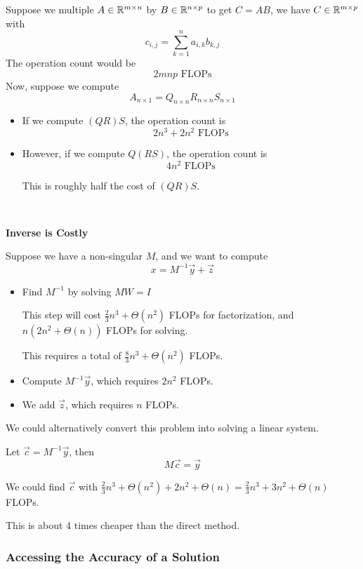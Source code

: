 Suppose we multiple \( A \in \mathbb{R}^{m \times n} \) by \( B \in \mathbb{R}^{n \times p} \) to get \( C = AB \), we have \( C \in \mathbb{R}^{m \times p} \) with \[
    c_{i, j} = \sum_{k=1}^n a_{i, k} b_{k, j}
\] The operation count would be \[
    2 mnp \text{ FLOPs}
\]
Now, suppose we compute \[
    A_{n \times 1} = Q_{n \times n} R_{n \times n} S_{n \times 1}
\]
\begin{itemize}
    \item If we compute \( (QR)S \), the operation count is \[
              2n^3 + 2n^2 \text{ FLOPs}
          \]

    \item However, if we compute \( Q(RS) \), the operation count is \[
              4n^2 \text{ FLOPs}
          \]

          This is roughly half the cost of \( (QR)S \).
\end{itemize}

{~~~}

\noindent
\textbf{Inverse is Costly}

Suppose we have a non-singular \( M \), and we want to compute \[
    x = M^{-1} \vec{y} + \vec{z}
\]

\begin{itemize}
    \item Find \( M^{-1} \) by solving \( MW = I \)

          This step will cost \( \frac{2}{3} n^3 + \Theta(n^2) \) FLOPs for factorization, and \( n \left( 2n^2 + \Theta(n) \right) \) FLOPs for solving.

          This requires a total of \( \frac{8}{3} n^3 + \Theta(n^2) \) FLOPs.

    \item Compute \( M^{-1} \vec{y} \), which requires \( 2n^2 \) FLOPs.

    \item We add \( \vec{z} \), which requires \( n \) FLOPs.
\end{itemize}

We could alternatively convert this problem into solving a linear system.

Let \( \vec{c} = M^{-1} \vec{y} \), then \[
    M\vec{c} = \vec{y}
\]

We could find \( \vec{c} \) with \( \frac{2}{3} n^3 + \Theta(n^2) + 2n^2 + \Theta(n) = \frac{2}{3} n^3 + 3n^2 + \Theta(n) \) FLOPs.

This is about 4 times cheaper than the direct method.

\subsubsection{Accessing the Accuracy of a Solution}


